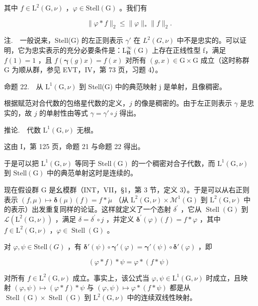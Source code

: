 其中 \(f\in \mathrm{L}^2 (\mathrm{G},\nu)\) ，\(\varphi \in \mathrm{Stell}(\mathrm{G})\) 。我们有

\[
\| \varphi * f \| _ {2} \leqslant \| \varphi \| _ {*} \| f \| _ {2}.\tag{8}
\]

注.　一般说来，Stell(G) 的左正则表示 \(\gamma'\) 在 \(L^{2}(G,\nu)\) 中不是忠实的。可以证明，它为忠实表示的充分必要条件是：\(\mathrm{L}_{\mathbf{R}}^{\infty}(\mathrm{G})\) 上存在正线性型 f，满足 \(f(1)=1\) ，且 \(f(\boldsymbol{\gamma}(g)x)=f(x)\) 对所有 \((g,x)\in\mathrm{G}\times\mathrm{G}\) 成立（这时称群 G 为顺从群，参见 EVT，IV，第 73 页，习题 4）。

命题 22.　从 \(\mathrm{L}^{1}(\mathrm{G},\nu)\) 到 Stell(G) 中的典范映射 j 是单射，且像稠密。

根据赋范对合代数的包络星代数的定义，\(j\) 的像是稠密的。由于左正则表示 \(\gamma\) 是忠实的，故 \(j\) 的单射性由等式 \(\gamma = \gamma' \circ j\) 得出。

推论.　代数 \(\mathrm{L}^{1}(\mathrm{G},\nu)\) 无根。

这由 I，第 125 页，命题 21 与命题 22 得出。

于是可以把 \(\mathrm{L}^{1}(\mathrm{G},\nu)\) 等同于 \(\mathrm{Stell}(\mathrm{G})\) 的一个稠密对合子代数，而 \(\mathrm{L}^{1}(\mathrm{G},\nu)\) 到 \(\mathrm{Stell}(\mathrm{G})\) 中的典范单射这时是连续的。

现在假设群 G 是幺模群（INT，VII，§1，第 3 节，定义 3）。于是可以从右正则表示 \((f,\mu)\mapsto\boldsymbol{\delta}(\mu)(f)=f*\breve{\mu}\) （从 \(\mathrm{L}^{2}(\mathrm{G},\nu)\times\mathcal{M}^{1}(\mathrm{G})\) 到 \(\mathrm{L}^{2}(\mathrm{G},\nu)\) 中的表示）出发重复同样的论证。这样就定义了一个态射 \(\delta^{\prime}\) ，它从 \(\operatorname{Stell}(\mathrm{G})\) 到 \(\mathcal{L}(\mathrm{L}^{2}(\mathrm{G},\nu))\) ，满足 \(\delta=\delta^{\prime}\circ j\) ，并定义 \(\boldsymbol{\delta}^{\prime}(\varphi)(f)=f*\varphi\) ，其中 \(f\in\mathrm{L}^{2}(\mathrm{G},\nu)\) ，\(\varphi\in\operatorname{Stell}(\mathrm{G})\) 。

对 \(\varphi, \psi \in \text{Stell}(G)\) ，有 \(\boldsymbol{\delta}'(\psi) \circ \boldsymbol{\gamma}'(\varphi) = \boldsymbol{\gamma}'(\psi) \circ \boldsymbol{\delta}'(\varphi)\) ，即

\[
(\varphi * f) * \psi = \varphi * (f * \psi)\tag{9}
\]

对所有 \(f \in \mathrm{L}^{2}(\mathrm{G}, \nu)\) 成立。事实上，该公式当 \(\varphi, \psi \in \mathrm{L}^{1}(\mathrm{G}, \nu)\) 时成立，且映射 \((\varphi, \psi) \mapsto (\varphi * f) * \psi\) 与 \((\varphi, \psi) \mapsto \varphi * (f * \psi)\) 都是从 \(\operatorname{Stell}(\mathrm{G}) \times \operatorname{Stell}(\mathrm{G})\) 到 \(\mathrm{L}^{2}(\mathrm{G}, \nu)\) 中的连续双线性映射。

